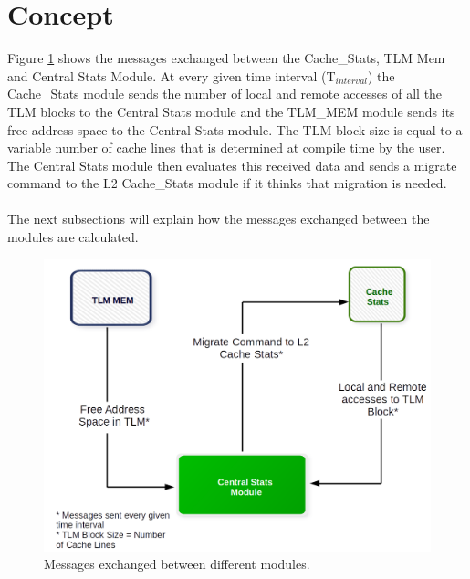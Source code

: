 \documentclass{listhesis}
\begin{document}
\section{Concept}
Figure \ref{fig:approachOfSolution} shows the messages exchanged between the Cache{\_}Stats, TLM Mem and Central Stats Module. At every given time interval (T$_{interval}$) the Cache{\_}Stats module sends the number of local and remote accesses of all the TLM blocks to the Central Stats module and the TLM{\_}MEM module sends its free address space to the Central Stats module. The TLM block size is equal to a variable number of cache lines that is determined at compile time by the user. The Central Stats module then evaluates this received data and sends a migrate command to the L2 Cache{\_}Stats module if it thinks that migration is needed. \\
\\
The next subsections will explain how the messages exchanged between the modules are calculated. 
\begin{figure}
  \includegraphics[width=0.8\linewidth]{approachOfSolution.png}
  \centering
  \caption{Messages exchanged between different modules.}
  \label{fig:approachOfSolution}
\end{figure}
\end{document}
